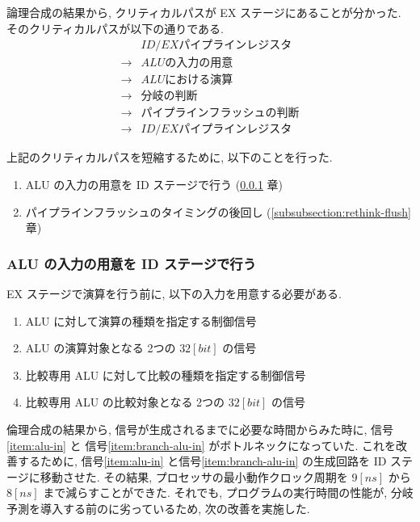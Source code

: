\documentclass[../improvements.tex]{subfiles}
\begin{document}
  論理合成の結果から, クリティカルパスが EX ステージにあることが分かった.
  そのクリティカルパスが以下の通りである.
  \begin{displaymath}
    \begin{aligned}
      &ID/EX パイプラインレジスタ \\
      \rightarrow &ALU の入力の用意 \\
      \rightarrow &ALU における演算 \\
      \rightarrow &分岐の判断 \\
      \rightarrow &パイプラインフラッシュの判断 \\
      \rightarrow &ID/EX パイプラインレジスタ
    \end{aligned}
  \end{displaymath}

  上記のクリティカルパスを短縮するために, 以下のことを行った.
  \begin{enumerate}
    \item ALU の入力の用意を ID ステージで行う (\ref{subsubsection:ex-to-id} 章)
    \item パイプラインフラッシュのタイミングの後回し (\ref{subsubsection:rethink-flush} 章)
  \end{enumerate}

  \subsubsection{ALU の入力の用意を ID ステージで行う} \label{subsubsection:ex-to-id}
  EX ステージで演算を行う前に, 以下の入力を用意する必要がある.
  \begin{enumerate}
    \item ALU に対して演算の種類を指定する制御信号 \label{item:alu-op}
    \item ALU の演算対象となる 2つの $32[bit]$ の信号 \label{item:alu-in}
    \item 比較専用 ALU に対して比較の種類を指定する制御信号 \label{item:branch-alu-op}
    \item 比較専用 ALU の比較対象となる 2つの $32[bit]$ の信号 \label{item:branch-alu-in}
  \end{enumerate}
  倫理合成の結果から, 信号が生成されるまでに必要な時間からみた時に,
  信号\ref{item:alu-in} と 信号\ref{item:branch-alu-in} がボトルネックになっていた.
  これを改善するために, 信号\ref{item:alu-in} と信号\ref{item:branch-alu-in} の生成回路を
  ID ステージに移動させた.
  その結果, プロセッサの最小動作クロック周期を $9[ns]$ から $8[ns]$ まで減らすことができた.
  それでも, プログラムの実行時間の性能が, 分岐予測を導入する前のに劣っているため, 
  次の改善を実施した.
\end{document}
